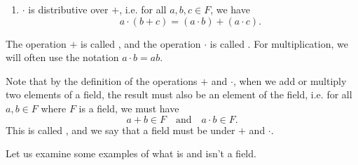 \begin{defn}
\begin{enumerate}
    \item $ \cdot $ is distributive over $ + $, i.e. for all $ a,b,c\in F $, we have
    \begin{equation*}
        a\cdot(b+c)=(a\cdot b)+(a\cdot c).
    \end{equation*}
\end{enumerate}

The operation $ + $ is called , and the operation $ \cdot $ is called . For multiplication, we will often use the notation $ a\cdot b=ab $.
\end{defn}

Note that by the definition of the operations $ + $ and $ \cdot $, when we add or multiply two elements of a field, the result must also be an element of the field, i.e. for all $ a,b\in F $ where $ F $ is a field, we must have
\begin{equation*}
a+b\in F \quad\text{and}\quad a\cdot b\in F.
\end{equation*}
This is called , and we say that a field must be  under $ + $ and $ \cdot $.

Let us examine some examples of what is and isn't a field.

